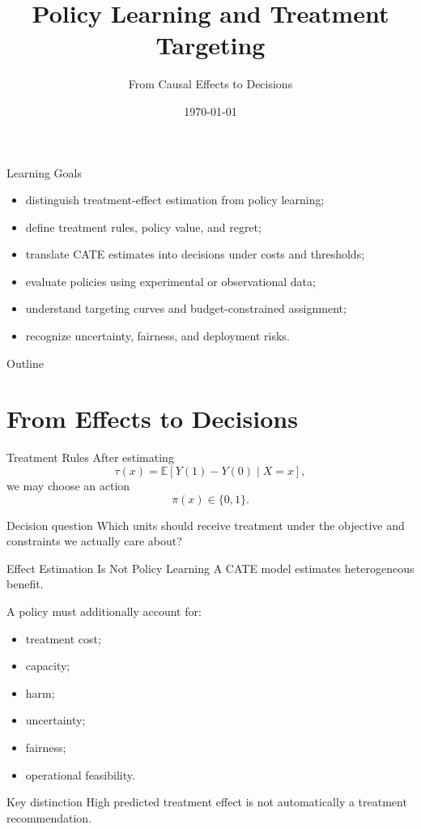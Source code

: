 \documentclass[aspectratio=169,11pt]{beamer}
\title[Policy Learning]{Policy Learning and Treatment Targeting}
\subtitle{From Causal Effects to Decisions}
\date{\today}
\newcommand{\E}{\mathbb{E}}
\begin{document}
\begin{frame}
\titlepage
\end{frame}

\begin{frame}{Learning Goals}
\begin{itemize}
\item distinguish treatment-effect estimation from policy learning;
\item define treatment rules, policy value, and regret;
\item translate CATE estimates into decisions under costs and thresholds;
\item evaluate policies using experimental or observational data;
\item understand targeting curves and budget-constrained assignment;
\item recognize uncertainty, fairness, and deployment risks.
\end{itemize}
\end{frame}

\begin{frame}{Outline}
\tableofcontents
\end{frame}

\section{From Effects to Decisions}

\begin{frame}{Treatment Rules}
After estimating
\[
\tau(x)=\E[Y(1)-Y(0)\mid X=x],
\]
we may choose an action
\[
\pi(x)\in\{0,1\}.
\]

\begin{block}{Decision question}
Which units should receive treatment under the objective and constraints we actually care about?
\end{block}
\end{frame}

\begin{frame}{Effect Estimation Is Not Policy Learning}
A CATE model estimates heterogeneous benefit.

A policy must additionally account for:
\begin{itemize}
\item treatment cost;
\item capacity;
\item harm;
\item uncertainty;
\item fairness;
\item operational feasibility.
\end{itemize}

\begin{alertblock}{Key distinction}
High predicted treatment effect is not automatically a treatment recommendation.
\end{alertblock}
\end{frame}
\end{document}
